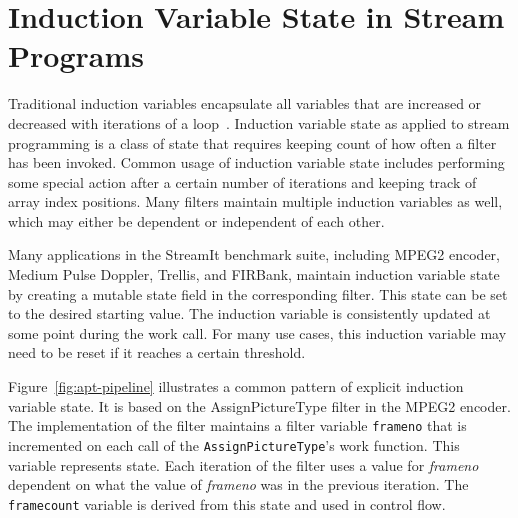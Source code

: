 \section{Induction Variable State in Stream Programs}
\label{sec:inductionstate}

  




Traditional induction variables encapsulate all variables that are
increased or decreased with iterations of a loop~\cite{Aho:1986, Fischer:2009}.  Induction variable
state as applied to stream programming is a class of state that
requires keeping count of how often a filter has been invoked.  Common
usage of induction variable state includes performing some special
action after a certain number of iterations and keeping track of array
index positions.  Many filters maintain multiple induction variables
as well, which may either be dependent or independent of each other.

Many applications in the StreamIt benchmark suite, including MPEG2 encoder,
Medium Pulse Doppler, Trellis, and FIRBank, maintain induction variable state 
by creating a mutable state field in the corresponding filter.  This
state can be set to the desired starting value.  The induction
variable is consistently updated at some point during the work call.
For many use cases, this induction variable may need to be reset if it
reaches a certain threshold. 

Figure~\ref{fig:apt-pipeline} illustrates a common pattern of explicit
induction variable state.  It is based on the AssignPictureType filter in 
the MPEG2 encoder. The implementation of the filter maintains
a filter variable {\tt frameno} that is incremented on each call of
the {\tt AssignPictureType}'s work function.  This variable
represents state.  Each iteration of the 
filter uses a value for {\it frameno} dependent on what the value of
{\it frameno} was in the previous iteration.  The {\tt framecount} variable is derived
from this state and used in control flow.

